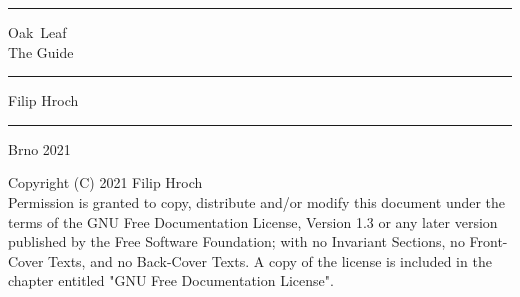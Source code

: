 
\begin{titlepage}
    \newfontfamily{}
  \begin{center}
    \vspace*{1em}
    \textcolor{oakgreen}{\rule{\textwidth}{4pt}}\par
    \vspace*{5em}
    \begin{minipage}{0.5\textwidth}
      \textcolor{oakgreen}{\fontsize{10em}{10em}\selectfont {}}
    \end{minipage}
    \begin{minipage}{0.3\textwidth}
      \begin{flushright}
        {\bftitlefont \fontsize{3em}{3em} \selectfont Oak~Leaf}\\[2em]
        {\bftitlefont \fontsize{2em}{2em} \selectfont The Guide}\\[1em]
      \end{flushright}
    \end{minipage}\par
    \vspace*{5em}
    \textcolor{oakgreen}{\rule{\textwidth}{4pt}}\par
    \vspace*{2em}
    \begin{minipage}{0.8\textwidth}
      \begin{flushright}
        {\bftitlefont \fontsize{1.5em}{1.5em} \selectfont Filip Hroch}
      \end{flushright}
    \end{minipage}\par
    \vspace*{20em}
    \textcolor{oakgreen}{\rule{\textwidth}{2pt}}\par
    \vspace*{1em}
    \begin{minipage}{0.8\textwidth}
      \begin{flushright}
        {\bftitlefont \fontsize{1.5em}{1.5em} \selectfont Brno 2021}
      \end{flushright}
    \end{minipage}
  \end{center}

  \newpage
  \mbox{}
  \vfill
  \noindent
  Copyright (C)  2021  Filip Hroch\\
    Permission is granted to copy, distribute and/or modify this document
    under the terms of the GNU Free Documentation License, Version 1.3
    or any later version published by the Free Software Foundation;
    with no Invariant Sections, no Front-Cover Texts, and no Back-Cover Texts.
    A copy of the license is included in the chapter entitled "GNU
    Free Documentation License".

\end{titlepage}
